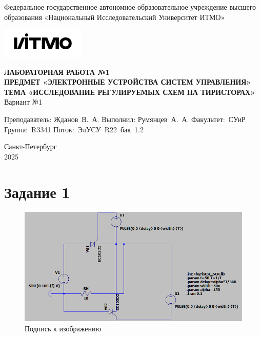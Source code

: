 \documentclass[a4paper, 12pt]{article}
\begin{document}
    \begin{titlepage}

        \begin{center}
        Федеральное государственное автономное образовательное учреждение высшего образования
        «Национальный Исследовательский Университет ИТМО»
        \vfill
        
        \includegraphics[width=0.3\textwidth]{itmo.png} %

        {\large\bf ЛАБОРАТОРНАЯ РАБОТА №1}\\
        {\large\bf ПРЕДМЕТ «ЭЛЕКТРОННЫЕ УСТРОЙСТВА СИСТЕМ УПРАВЛЕНИЯ»}\\
        {\large\bf ТЕМА «ИССЛЕДОВАНИЕ РЕГУЛИРУЕМЫХ СХЕМ НА ТИРИСТОРАХ»}\\
        Вариант №1
        \vfill

        \begin{flushright}
            \begin{minipage}{.45\textwidth}
            {
                \hbox{Преподаватель:}
                \hbox{Жданов В. А.}
                \hbox{}
                \hbox{Выполнил:}
                \hbox{Румянцев А. А.}
                \hbox{}
                \hbox{Факультет: СУиР}
                \hbox{Группа: R3341}
                \hbox{Поток: ЭлУСУ R22 бак 1.2}
            }
            \end{minipage}
        \end{flushright}
        \vfill
  
        Санкт-Петербург\\
        2025
        \end{center}
    \end{titlepage}
    
    \tableofcontents

    \newpage
    \section{Задание 1}
    \begin{figure}[H]
        \centering
        \includegraphics[scale=0.7]{scheme1.png}
        \captionsetup{skip=0pt}
        \caption{Подпись к изображению}
        \label{fig:scheme1}
    \end{figure}
\end{document}
